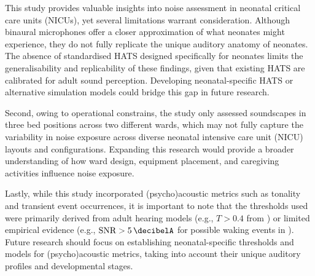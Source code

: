 This study provides valuable insights into noise assessment in neonatal critical care units (NICUs), yet several limitations warrant consideration. Although binaural microphones offer a closer approximation of what neonates might experience, they do not fully replicate the unique auditory anatomy of neonates. The absence of standardised HATS designed specifically for neonates limits the generalisability and replicability of these findings, given that existing HATS are calibrated for adult sound perception. Developing neonatal-specific HATS or alternative simulation models could bridge this gap in future research.

Second, owing to operational constrains, the study only assessed soundscapes in three bed positions across two different wards, which may not fully capture the variability in noise exposure across diverse neonatal intensive care unit (NICU) layouts and configurations. Expanding this research  would provide a broader understanding of how ward design, equipment placement, and caregiving activities influence noise exposure.

Lastly, while this study incorporated (psycho)acoustic metrics such as tonality and transient event occurrences, it is important to note that the thresholds used were primarily derived from adult hearing models (e.g., $T>0.4$ from \citep{International2020}) or limited empirical evidence (e.g., $\text{SNR}>\dba{5}$ for possible waking events in \citep{kuhn_evaluating_2011}). Future research should focus on establishing neonatal-specific thresholds and models for (psycho)acoustic metrics, taking into account their unique auditory profiles and developmental stages.